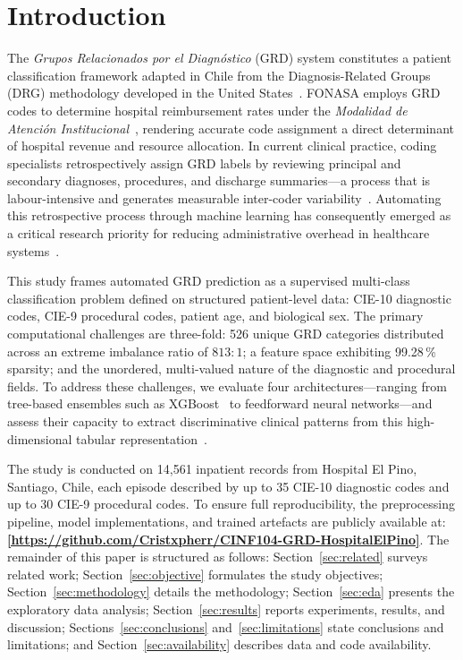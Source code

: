 \documentclass[journal]{IEEEtran}
\begin{document}
\section{Introduction}
\label{sec:intro}

The \emph{Grupos Relacionados por el Diagn\'ostico} (GRD)
system constitutes a patient classification framework adapted
in Chile from the Diagnosis-Related Groups (DRG) methodology
developed in the United States~\cite{slee1978}.  FONASA employs
GRD codes to determine hospital reimbursement rates under the
\emph{Modalidad de Atenci\'on Institucional}~\cite{minsal2013},
rendering accurate code assignment a direct determinant of
hospital revenue and resource allocation.  In current clinical
practice, coding specialists retrospectively assign GRD labels
by reviewing principal and secondary diagnoses, procedures, and
discharge summaries---a process that is labour-intensive and
generates measurable inter-coder variability~\cite{goldstein2017}.
Automating this retrospective process through machine learning
has consequently emerged as a critical research priority for
reducing administrative overhead in healthcare
systems~\cite{baumel2018,perotte2014}.

This study frames automated GRD prediction as a supervised
multi-class classification problem defined on structured
patient-level data: CIE-10 diagnostic codes, CIE-9 procedural
codes, patient age, and biological sex.  The primary
computational challenges are three-fold: 526 unique GRD
categories distributed across an extreme imbalance ratio of
$813{:}1$; a feature space exhibiting 99.28\,\% sparsity; and
the unordered, multi-valued nature of the diagnostic and
procedural fields.  To address these challenges, we evaluate
four architectures---ranging from tree-based ensembles such
as XGBoost~\cite{chen2016} to feedforward neural networks---and
assess their capacity to extract discriminative clinical patterns
from this high-dimensional tabular
representation~\cite{che2018,mullenbach2018}.

The study is conducted on 14,561 inpatient records from Hospital
El Pino, Santiago, Chile, each episode described by up to 35
CIE-10 diagnostic codes and up to 30 CIE-9 procedural codes.
To ensure full reproducibility, the preprocessing pipeline,
model implementations, and trained artefacts are publicly
available at: \textbf{\url{[https://github.com/Cristxpherr/CINF104-GRD-HospitalElPino]}}. 
The remainder of this paper is structured as follows:
Section~\ref{sec:related} surveys related work;
Section~\ref{sec:objective} formulates the study objectives;
Section~\ref{sec:methodology} details the methodology;
Section~\ref{sec:eda} presents the exploratory data analysis;
Section~\ref{sec:results} reports experiments, results, and
discussion; Sections~\ref{sec:conclusions}
and~\ref{sec:limitations} state conclusions and limitations;
and Section~\ref{sec:availability} describes data and code
availability.
\end{document}
